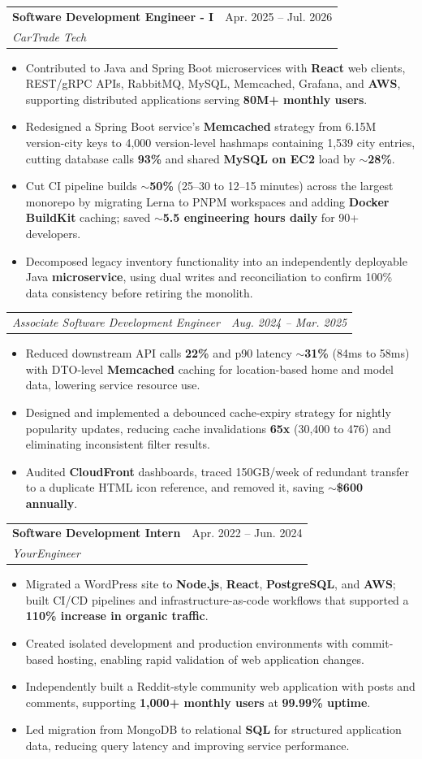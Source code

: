 \documentclass[letterpaper,11pt]{article}
\makeatletter
\newcommand{\resumeItem}[1]{
  \item\small{
    {#1 \vspace{-2pt}}
  }
}
\newcommand{\resumeSubheading}[4]{
  \vspace{-2pt}\item
    \begin{tabular*}{0.97\textwidth}[t]{l@{\extracolsep{\fill}}r}
      \textbf{#1} & #2 \\
      \textit{\small#3} & \textit{\small #4} \\
    \end{tabular*}\vspace{-7pt}
}
\newcommand{\resumeSubSubheading}[2]{
    \item
    \begin{tabular*}{0.97\textwidth}{l@{\extracolsep{\fill}}r}
      \textit{\small#1} & \textit{\small #2} \\
    \end{tabular*}\vspace{-7pt}
}
\newcommand{\resumeItemListStart}{\begin{itemize}}
\newcommand{\resumeItemListEnd}{\end{itemize}\vspace{-5pt}}
\makeatother
\begin{document}
\resumeSubheading
{Software Development Engineer - I}{Apr. 2025 -- Jul. 2026}
{CarTrade Tech}{ }
\resumeItemListStart
\resumeItem{Contributed to Java and Spring Boot microservices with \textbf{React} web clients, REST/gRPC APIs, RabbitMQ, MySQL, Memcached, Grafana, and \textbf{AWS}, supporting distributed applications serving \textbf{80M+ monthly users}.}
\resumeItem{Redesigned a Spring Boot service's \textbf{Memcached} strategy from 6.15M version-city keys to 4,000 version-level hashmaps containing 1,539 city entries, cutting database calls \textbf{93\%} and shared \textbf{MySQL on EC2} load by \textbf{$\sim$28\%}.}
\resumeItem{Cut CI pipeline builds \textbf{$\sim$50\%} (25--30 to 12--15 minutes) across the largest monorepo by migrating Lerna to PNPM workspaces and adding \textbf{Docker BuildKit} caching; saved \textbf{$\sim$5.5 engineering hours daily} for 90+ developers.}
\resumeItem{Decomposed legacy inventory functionality into an independently deployable Java \textbf{microservice}, using dual writes and reconciliation to confirm 100\% data consistency before retiring the monolith.}
\resumeItemListEnd
\resumeSubSubheading
{Associate Software Development Engineer}{Aug. 2024 -- Mar. 2025}
\resumeItemListStart
\resumeItem{Reduced downstream API calls \textbf{22\%} and p90 latency \textbf{$\sim$31\%} (84ms to 58ms) with DTO-level \textbf{Memcached} caching for location-based home and model data, lowering service resource use.}
\resumeItem{Designed and implemented a debounced cache-expiry strategy for nightly popularity updates, reducing cache invalidations \textbf{65x} (30,400 to 476) and eliminating inconsistent filter results.}
\resumeItem{Audited \textbf{CloudFront} dashboards, traced 150GB/week of redundant transfer to a duplicate HTML icon reference, and removed it, saving \textbf{$\sim$\$600 annually}.}
\resumeItemListEnd

\resumeSubheading
{Software Development Intern}{Apr. 2022 -- Jun. 2024}
{YourEngineer}{ }
\resumeItemListStart
\resumeItem{Migrated a WordPress site to \textbf{Node.js}, \textbf{React}, \textbf{PostgreSQL}, and \textbf{AWS}; built CI/CD pipelines and infrastructure-as-code workflows that supported a \textbf{110\% increase in organic traffic}.}
\resumeItem{Created isolated development and production environments with commit-based hosting, enabling rapid validation of web application changes.}
\resumeItem{Independently built a Reddit-style community web application with posts and comments, supporting \textbf{1,000+ monthly users} at \textbf{99.99\% uptime}.}
\resumeItem{Led migration from MongoDB to relational \textbf{SQL} for structured application data, reducing query latency and improving service performance.}
\resumeItemListEnd
\end{document}
